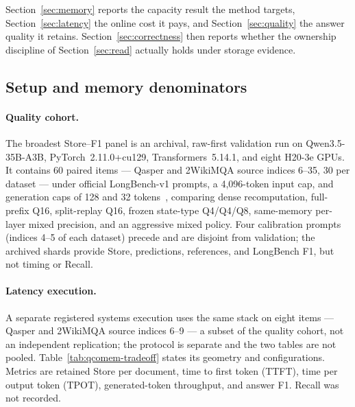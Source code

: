 \documentclass{article}
\begin{document}
Section~\ref{sec:memory} reports the capacity result the method targets,
Section~\ref{sec:latency} the online cost it pays, and
Section~\ref{sec:quality} the answer quality it retains.
Section~\ref{sec:correctness} then reports whether the ownership discipline of
Section~\ref{sec:read} actually holds under storage evidence.

\subsection{Setup and memory denominators}
\label{sec:setup}

\paragraph{Quality cohort.}
The broadest Store--F1 panel is an archival, raw-first validation run on
Qwen3.5-35B-A3B, PyTorch~2.11.0+cu129, Transformers~5.14.1, and eight H20-3e
GPUs. It contains 60 paired items --- Qasper and 2WikiMQA source indices 6--35,
30 per dataset --- under official LongBench-v1 prompts, a 4,096-token input
cap, and generation caps of 128 and 32
tokens~\citep{bai2024longbench,dasigi2021qasper,ho2020multihopqa}, comparing
dense recomputation, full-prefix Q16, split-replay Q16, frozen
state-type Q4/Q4/Q8, same-memory per-layer mixed precision, and an aggressive
mixed policy. Four calibration prompts (indices 4--5 of each dataset) precede
and are disjoint from validation; the archived shards provide Store,
predictions, references, and LongBench F1, but not timing or Recall.

\paragraph{Latency execution.}
A separate registered systems execution uses the same stack on eight items ---
Qasper and 2WikiMQA source indices 6--9 --- a subset of the quality cohort,
not an independent replication; the protocol is separate and the two tables are
not pooled.  Table~\ref{tab:qcomem-tradeoff} states its geometry and
configurations.  Metrics are retained Store per document, time to first token
(TTFT), time per output token (TPOT), generated-token throughput, and answer
F1.  Recall was not recorded.
\end{document}
